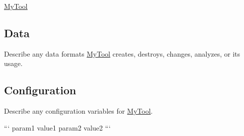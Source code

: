 \hyperlink{classMyTool}{My\-Tool}

\subsection*{Data}

Describe any data formats \hyperlink{classMyTool}{My\-Tool} creates, destroys, changes, analyzes, or its usage.

\subsection*{Configuration}

Describe any configuration variables for \hyperlink{classMyTool}{My\-Tool}.

``` param1 value1 param2 value2 ``` 